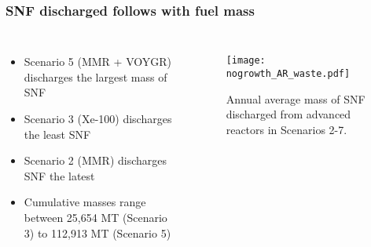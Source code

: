 \begin{frame}
    \frametitle{\gls{SNF} discharged follows with fuel mass}
    \begin{columns}
        \column[t]{4.3cm}
            \begin{itemize}
                \item Scenario 5 (MMR + VOYGR) discharges the largest mass of \gls{SNF}
                \item Scenario 3 (Xe-100) discharges the least \gls{SNF}
                \item Scenario 2 (MMR) discharges \gls{SNF} the latest
                \item Cumulative masses range between 25,654 MT (Scenario 3) to 
                      112,913 MT (Scenario 5)
                
            \end{itemize}
        \column[t]{6.3cm}
        \vspace{-1cm}
        \begin{figure}
                \centering
                \texttt{[image: nogrowth\_AR\_waste.pdf]}
                \caption{Annual average mass of \gls{SNF} discharged from 
                advanced reactors in Scenarios 2-7.}
                \label{fig:ot_waste}
        \end{figure}
    \end{columns}
\end{frame}